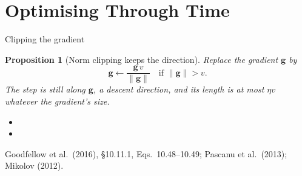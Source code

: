 \documentclass[aspectratio=169, 11pt]{beamer}
\newtheorem{propx}[theorem]{Proposition}
\newcommand{\srcline}[1]{%
  \par\vspace{0.25em}%
  {\scriptsize\color{mcMuted}\hfill #1\par}}
\newcommand{\src}[3]{}      %
\begin{document}
\section{Optimising Through Time}

\begin{frame}{Clipping the gradient}
  \src{goodfellow2016}{equation}{10.48-10.49}
  \src{goodfellow2016}{section}{10.11.1}
  \src{pascanu2013}{section}{3.2}
  \src{pascanu2013}{section}{2.3}
  \vspace{-0.45em}
  \begin{propx}[Norm clipping keeps the direction]\label{th:clip}
    \small
    Replace the gradient $\mathbf{g}$ by
    \[
      \mathbf{g} \leftarrow \frac{\mathbf{g}\,v}{\|\mathbf{g}\|} \quad \text{if } \|\mathbf{g}\| > v .
    \]
    The step is still along $\mathbf{g}$, a descent direction, and its
    length is at most $\eta v$ whatever the gradient's size.
  \end{propx}
  \vspace{0.05em}
  {\footnotesize
  \begin{itemize}\itemsep0.2em
    \item {}
    \item {}
  \end{itemize}}
  \vspace{-0.3em}
  \srcline{Goodfellow et al.\ (2016), \S10.11.1, Eqs.~10.48--10.49; Pascanu et al.\ (2013); Mikolov (2012).}
\end{frame}
\end{document}
